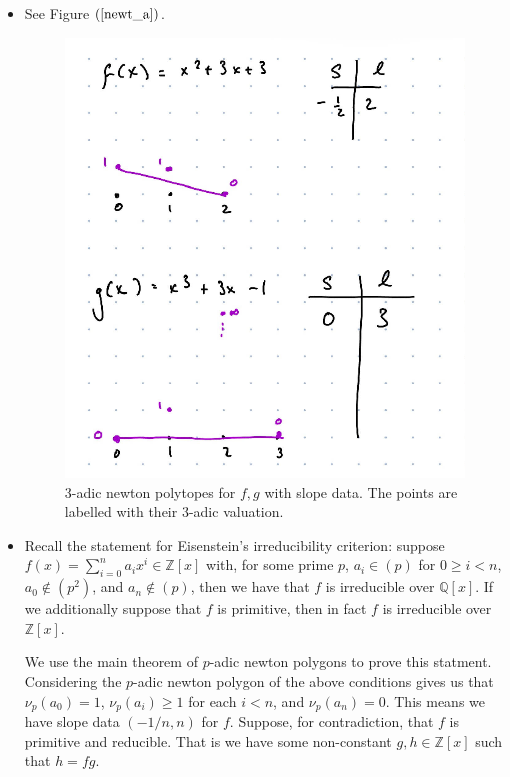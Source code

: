 \documentclass[12pt,letterpaper,boxed]{hmcpset}
\newcommand{\Z}{\mathbb Z}
\begin{document}
\begin{solution}
\begin{itemize}
\item See Figure $(\ref{newt_a})$.
\begin{figure}[h]
	\centering
	\includegraphics[scale=0.5]{newt_a.png}	
	\caption{$3$-adic newton polytopes for $f,g$ with slope data.
	The points are labelled with their $3$-adic valuation.}
	\label{newt_a}
\end{figure}

\item Recall the statement for Eisenstein's irreducibility criterion:
suppose $f(x) = \sum_{i=0}^{n} a_i x^i \in \Z[x]$ with, for some prime
$p$, $a_i \in (p)$ for $0 \geq i < n$, $a_0 \not\in (p^2)$, and $a_n
\not \in (p)$, then we have that $f$ is irreducible over $\mathbb Q
[x]$. If we additionally suppose that $f$ is primitive, then in fact
$f$ is irreducible over $\Z[x]$.

We use the main theorem of $p$-adic newton polygons to prove this
statment. Considering the $p$-adic newton polygon of the above
conditions gives us that $\nu_p(a_0) = 1$, $\nu_p(a_i) \geq 1$ for
each $i < n$, and $\nu_p(a_n) = 0$. This means we have slope data
$(-1/n, n)$ for $f$. Suppose, for contradiction, that $f$ is primitive and reducible. That
is we have some non-constant $g,h \in \Z[x]$ such that $h = fg$. 


\end{itemize}
\end{solution}
\end{document}
